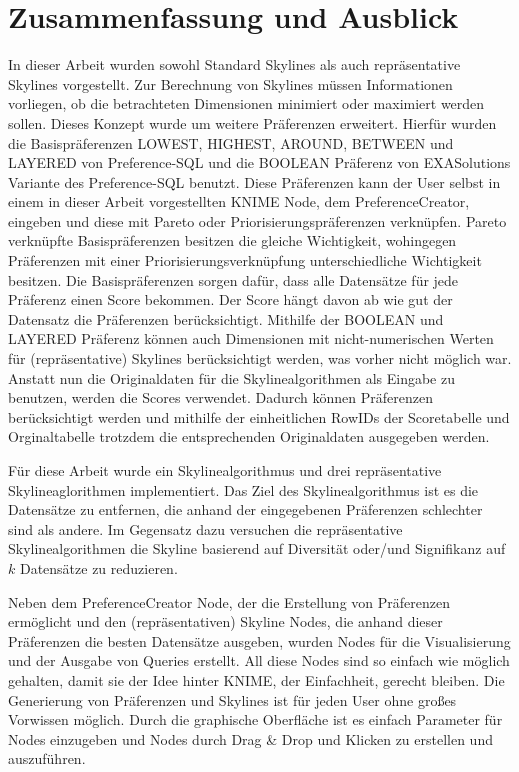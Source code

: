 \chapter{Zusammenfassung und Ausblick}
\label{ch:Zusammenfassung}
In dieser Arbeit wurden sowohl Standard Skylines als auch repräsentative Skylines vorgestellt. Zur Berechnung von Skylines müssen Informationen vorliegen, ob die betrachteten Dimensionen minimiert oder maximiert werden sollen. Dieses Konzept wurde um weitere Präferenzen erweitert. Hierfür wurden die Basispräferenzen LOWEST, HIGHEST, AROUND, BETWEEN und LAYERED von Preference-SQL und die BOOLEAN Präferenz von EXASolutions Variante des Preference-SQL benutzt. 
Diese Präferenzen kann der User selbst in einem in dieser Arbeit vorgestellten KNIME Node, dem PreferenceCreator, eingeben und diese mit Pareto oder Priorisierungspräferenzen verknüpfen. Pareto verknüpfte Basispräferenzen besitzen die gleiche Wichtigkeit, wohingegen Präferenzen mit einer Priorisierungsverknüpfung unterschiedliche Wichtigkeit besitzen. Die Basispräferenzen sorgen dafür, dass alle Datensätze für jede Präferenz einen Score bekommen. Der Score hängt davon ab wie gut der Datensatz die Präferenzen berücksichtigt. 
Mithilfe der BOOLEAN und LAYERED Präferenz können auch Dimensionen mit nicht-numerischen Werten für (repräsentative) Skylines berücksichtigt werden, was vorher nicht möglich war.  
Anstatt nun die Originaldaten für die Skylinealgorithmen als Eingabe zu benutzen, werden die Scores verwendet. Dadurch können Präferenzen berücksichtigt werden und mithilfe der einheitlichen RowIDs der Scoretabelle und Orginaltabelle trotzdem die entsprechenden Originaldaten ausgegeben werden. 

Für diese Arbeit wurde ein Skylinealgorithmus und drei repräsentative Skylineaglorithmen implementiert. Das Ziel des Skylinealgorithmus ist es die Datensätze zu entfernen, die anhand der eingegebenen Präferenzen schlechter sind als andere. Im Gegensatz dazu versuchen die repräsentative Skylinealgorithmen die Skyline basierend auf Diversität oder/und Signifikanz auf $k$ Datensätze zu reduzieren.

Neben dem PreferenceCreator Node, der die Erstellung von Präferenzen ermöglicht und den (repräsentativen) Skyline Nodes, die anhand dieser Präferenzen die besten Datensätze ausgeben, wurden Nodes für die Visualisierung und der Ausgabe von Queries erstellt. All diese Nodes sind so einfach wie möglich gehalten, damit sie der Idee hinter KNIME, der Einfachheit, gerecht bleiben. Die Generierung von Präferenzen und Skylines ist für jeden User ohne großes Vorwissen möglich. Durch die graphische Oberfläche ist es einfach Parameter für Nodes einzugeben und Nodes durch Drag \& Drop und Klicken zu erstellen und auszuführen.  

